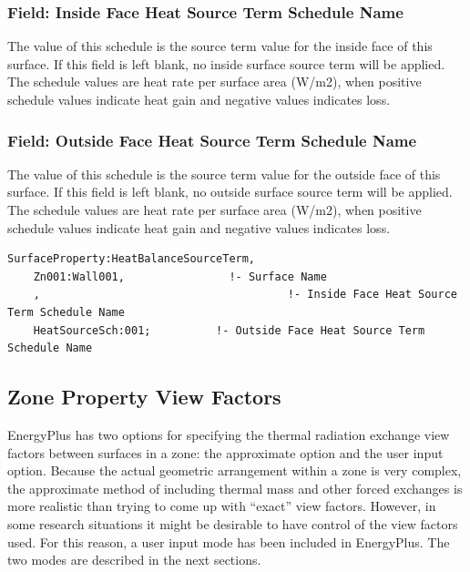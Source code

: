 \subsubsection{Field: Inside Face Heat Source Term Schedule Name}\label{field-inside-heat-source-term-schedule-name}

The value of this schedule is the source term value for the inside face of this surface. If this field is left blank, no inside surface source term will be applied. The schedule values are heat rate per surface area (W/m2), when positive schedule values indicate heat gain and negative values indicates loss.

\subsubsection{Field: Outside Face Heat Source Term Schedule Name}\label{field-outside-heat-source-term-schedule-name}

The value of this schedule is the source term value for the outside face of this surface. If this field is left blank, no outside surface source term will be applied. The schedule values are heat rate per surface area (W/m2), when positive schedule values indicate heat gain and negative values indicates loss.

\begin{lstlisting}
SurfaceProperty:HeatBalanceSourceTerm,
    Zn001:Wall001,                !- Surface Name
    ,                                      !- Inside Face Heat Source Term Schedule Name
    HeatSourceSch:001;          !- Outside Face Heat Source Term Schedule Name
\end{lstlisting}

\subsection{Zone Property View Factors}\label{zone-property-view-factors}

EnergyPlus has two options for specifying the thermal radiation exchange view factors between surfaces in a zone: the approximate option and the user input option. Because the actual geometric arrangement within a zone is very complex, the approximate method of including thermal mass and other forced exchanges is more realistic than trying to come up with ``exact'' view factors. However, in some research situations it might be desirable to have control of the view factors used. For this reason, a user input mode has been included in EnergyPlus. The two modes are described in the next sections.

